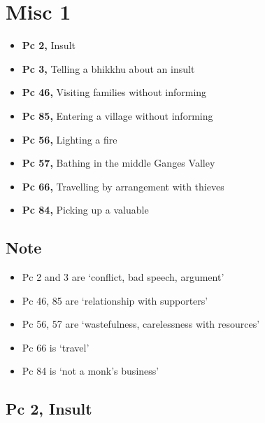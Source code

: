 \chapter{Misc 1}

\begin{itemize}
\tightlist
\item
  \textbf{Pc 2,} Insult
\item
  \textbf{Pc 3,} Telling a bhikkhu about an insult
\item
  \textbf{Pc 46,} Visiting families without informing
\item
  \textbf{Pc 85,} Entering a village without informing
\item
  \textbf{Pc 56,} Lighting a fire
\item
  \textbf{Pc 57,} Bathing in the middle Ganges Valley
\item
  \textbf{Pc 66,} Travelling by arrangement with thieves
\item
  \textbf{Pc 84,} Picking up a valuable
\end{itemize}

\section{Note}

\begin{itemize}
\tightlist
\item
  Pc 2 and 3 are `conflict, bad speech, argument'
\item
  Pc 46, 85 are `relationship with supporters'
\item
  Pc 56, 57 are `wastefulness, carelessness with resources'
\item
  Pc 66 is `travel'
\item
  Pc 84 is `not a monk's business'
\end{itemize}

\section{Pc 2, Insult}

